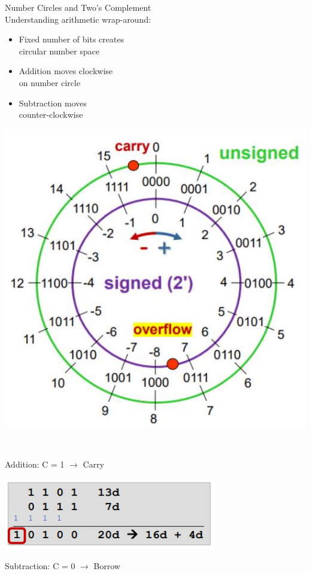 \begin{concept}{Number Circles and Two's Complement}\\
Understanding arithmetic wrap-around:

\begin{minipage}{0.45\linewidth}
\begin{itemize}
  \item Fixed number of bits creates \\circular number space
  \item Addition moves clockwise \\on number circle
  \item Subtraction moves \\counter-clockwise
\end{itemize}
\end{minipage}
\begin{minipage}{0.5\linewidth}
\includegraphics[width=\linewidth]{images/2024_12_29_79e6b22f503fb7b4f718g-04(2)}
\end{minipage}
\vspace{2mm}\\
\begin{minipage}[t]{0.4\linewidth}
Addition: C = 1 $\rightarrow$ Carry

\includegraphics[width=\linewidth]{images/addcarry.png}
\end{minipage}
\begin{minipage}[t]{0.55\linewidth}
Subtraction: C = 0 $\rightarrow$ Borrow


\end{minipage}
\end{concept}

